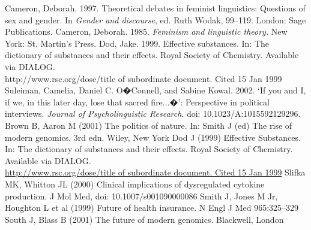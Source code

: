 \begin{thebibliography}{99.}
%
 Cameron, Deborah. 1997. Theoretical debates in feminist linguistics: Questions of sex and gender. In \textit{Gender and discourse}, ed. Ruth Wodak, 99--119. London: Sage Publications.
%
 Cameron, Deborah. 1985. \textit{Feminism and linguistic theory.} New York: St. Martin's Press.
%
 Dod, Jake. 1999. Effective substances. In: The dictionary of substances and their effects. Royal Society of Chemistry. Available via DIALOG. \\
http://www.rsc.org/dose/title of subordinate document. Cited 15 Jan 1999
%
 Suleiman, Camelia, Daniel C. O�Connell, and Sabine Kowal. 2002. `If you and I, if we, in this later day, lose that sacred fire...�': Perspective in political interviews. \textit{Journal of Psycholinguistic Research}. doi: 10.1023/A:1015592129296.
%
%
%
\bigskip
%
%
%
%
 Brown B, Aaron M (2001) The politics of nature. In: Smith J (ed) The rise of modern genomics, 3rd edn. Wiley, New York 
%
 Dod J (1999) Effective Substances. In: The dictionary of substances and their effects. Royal Society of Chemistry. Available via DIALOG. \\
\url{http://www.rsc.org/dose/title of subordinate document. Cited 15 Jan 1999}
%
 Slifka MK, Whitton JL (2000) Clinical implications of dysregulated cytokine production. J Mol Med, doi: 10.1007/s001090000086
%
 Smith J, Jones M Jr, Houghton L et al (1999) Future of health insurance. N Engl J Med 965:325--329
%
 South J, Blass B (2001) The future of modern genomics. Blackwell, London 
%
\end{thebibliography}
